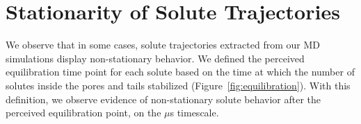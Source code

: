 \documentclass{article}
\begin{document}
  \newpage
  
  \section{Stationarity of Solute Trajectories}\label{section:msd_comparison}

  We observe that in some cases, solute trajectories extracted from our MD
  simulations display non-stationary behavior. We defined the perceived
  equilibration time point for each solute based on the time at which the
  number of solutes inside the pores and tails stabilized
  (Figure~\ref{fig:equilibration}). With this definition, we observe
  evidence of non-stationary solute behavior after the perceived equilibration
  point, on the $\mu$s timescale. 
  
  
%
  
\end{document}
